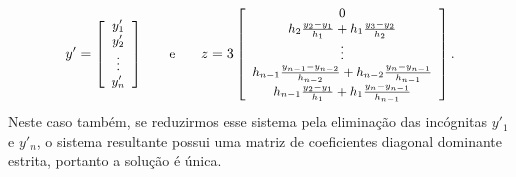 \begin{equation*}
	\begin{small}
			y'= \left[\begin{array}{c}
				y'_1\\
				y'_2\\
				\vdots\\
				y'_n
		\end{array}\right]\qquad \hbox{e}\qquad
		z = 3\left[\begin{array}{c}
				0\\
				h_2\frac{y_2-y_1}{h_1}+h_1\frac{y_3-y_2}{h_2}\\
				\vdots\\
				h_{n-1}\frac{y_{n-1}-y_{n-2}}{h_{n-2}}+h_{n-2}\frac{y_n-y_{n-1}}{h_{n-1}}\\
				h_{n-1}\frac{y_2-y_1}{h_1}+h_1\frac{y_n-y_{n-1}}{h_{n-1}}\\
			\end{array}\right].
	\end{small}
\end{equation*}
Neste caso também, se reduzirmos esse sistema pela eliminação das incógnitas $y'_1$ e $y'_n$, o sistema resultante possui uma matriz de coeficientes diagonal dominante estrita, portanto a solução é única.



